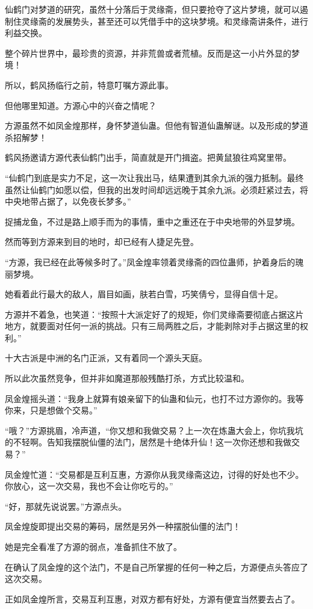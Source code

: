 \begin{this_body}
仙鹤门对梦道的研究，虽然十分落后于灵缘斋，但只要抢夺了这片梦境，就可以遏制住灵缘斋的发展势头，甚至还可以凭借手中的这块梦境。和灵缘斋讲条件，进行利益交换。

整个碎片世界中，最珍贵的资源，并非荒兽或者荒植。反而是这一小片外显的梦境！

所以，鹤风扬临行之前，特意叮嘱方源此事。

但他哪里知道。方源心中的兴奋之情呢？

方源虽然不如凤金煌那样，身怀梦道仙蛊。但他有智道仙蛊解谜。以及形成的梦道杀招解梦！

鹤风扬邀请方源代表仙鹤门出手，简直就是开门揖盗。把黄鼠狼往鸡窝里带。

“仙鹤门到底是实力不足，这一次让我出马，结果遭到其余九派的强力抵制。最终虽然让仙鹤门如愿以偿，但我的出发时间却远远晚于其余九派。必须赶紧过去，将中央地带占据了，以免夜长梦多。”

捉捕龙鱼，不过是路上顺手而为的事情，重中之重还在于中央地带的外显梦境。

然而等到方源来到目的地时，却已经有人捷足先登。

“方源，我已经在此等候多时了。”凤金煌率领着灵缘斋的四位蛊师，护着身后的瑰丽梦境。

她看着此行最大的敌人，眉目如画，肤若白雪，巧笑倩兮，显得自信十足。

方源并不着急，也笑道：“按照十大派定好了的规矩，你们灵缘斋要彻底占据这片地方，就要面对任何一派的挑战。只有三局两胜之后，才能剥除对手占据这里的权利。”

十大古派是中洲的名门正派，又有着同一个源头天庭。

所以此次虽然竞争，但并非如魔道那般残酷打杀，方式比较温和。

凤金煌摇头道：“我身上就算有娘亲留下的仙蛊和仙元，也打不过方源你的。我等你来，只是想做个交易。”

“哦？”方源挑眉，冷声道，“你又想和我做交易？上一次在炼蛊大会上，你坑我坑的不轻啊。告知我摆脱仙僵的法门，居然是十绝体升仙！这一次你还想和我做交易？”

凤金煌忙道：“交易都是互利互惠，方源你从我灵缘斋这边，讨得的好处也不少。你放心，这一次交易，我也不会让你吃亏的。”

“好，那就先说说罢。”方源点头。

凤金煌旋即提出交易的筹码，居然是另外一种摆脱仙僵的法门！

她是完全看准了方源的弱点，准备抓住不放了。

在确认了凤金煌的这个法门，不是自己所掌握的任何一种之后，方源便点头答应了这次交易。

正如凤金煌所言，交易互利互惠，对双方都有好处，方源有便宜当然要去占了。


\end{this_body}
